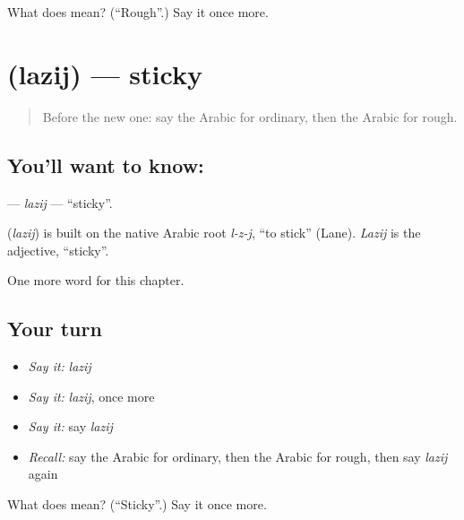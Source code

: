 \begin{tcolorbox}[breakable,colback=teal!4,colframe=teal!35!black,title={Before you move on}]
What does  mean? (\textquotedblleft{}Rough\textquotedblright{}.) Say it once more.
\end{tcolorbox}
\section[\texorpdfstring{\ar{لزج} (lazij)}{لزج (lazij)}]{ (lazij) — sticky}

\label{lesson:AR-C212-lazij}



\begin{quote}
Before the new one: say the Arabic for ordinary, then the Arabic for rough.
\end{quote}

\subsection*{You'll want to know: }
\textbf{} — \emph{lazij} — \textquotedblleft{}sticky\textquotedblright{}.

\begin{cousinweb}
\textbf{} (\emph{lazij}) is built on the native Arabic root \emph{l-z-j}, \textquotedblleft{}to stick\textquotedblright{} (Lane). \emph{Lazij} is the adjective, \textquotedblleft{}sticky\textquotedblright{}.
\end{cousinweb}

\begin{grammarlens}[title={What you've built}]
One more word for this chapter.
\end{grammarlens}

\subsection*{Your turn}
\begin{itemize}
\raggedright
  \item \emph{Say it:} \emph{lazij}
  \item \emph{Say it:} \emph{lazij}, once more
  \item \emph{Say it:} say \emph{lazij}
  \item \emph{Recall:} say the Arabic for ordinary, then the Arabic for rough, then say \emph{lazij} again
\end{itemize}

\begin{tcolorbox}[breakable,colback=teal!4,colframe=teal!35!black,title={Before you move on}]
What does  mean? (\textquotedblleft{}Sticky\textquotedblright{}.) Say it once more.
\end{tcolorbox}
